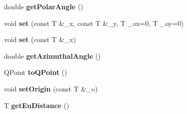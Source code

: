 \begin{DoxyCompactItemize}
\mbox{\label{classViewer_1_1SimpleVector3D_a61c728d69f9f2ff817113d7ee2db5b55}} 
double {\bfseries get\+Polar\+Angle} ()
\item 
\mbox{\label{classViewer_1_1SimpleVector2D_ab1560d4769dad5fa8bd88f34bfdc1beb}} 
void {\bfseries set} (const T \&\+\_\+x, const T \&\+\_\+y, T \+\_\+ox=0, T \+\_\+oy=0)
\item 
\mbox{\label{classViewer_1_1SimpleVector1D_a6b8fdb4e646f7826ce8ccfb41c4c45db}} 
void {\bfseries set} (const T \&\+\_\+x)
\item 
\mbox{\label{classViewer_1_1SimpleVector2D_a95e4bbcfc51a28ed3944f378183dcd4d}} 
double {\bfseries get\+Azimuthal\+Angle} ()
\item 
\mbox{\label{classViewer_1_1SimpleVector2D_afc891cd6fc33e5bcf8da2494168f6c21}} 
Q\+Point {\bfseries to\+Q\+Point} ()
\item 
\mbox{\label{classViewer_1_1SimpleVector1D_ac531dcabcb8b7d26125aedb2bc23a294}} 
void {\bfseries set\+Origin} (const T \&\+\_\+o)
\item 
\mbox{\label{classViewer_1_1SimpleVector1D_a8b9416bd2f5f50d35b1b9f0adff516eb}} 
T {\bfseries get\+Eu\+Distance} ()
\end{DoxyCompactItemize}
